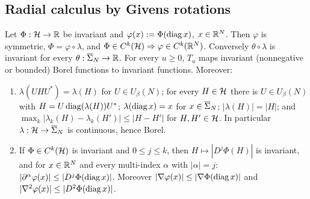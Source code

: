 \subsection{Radial calculus by Givens rotations}

\begin{lemma}\label{lem:inv}
Let $\Phi:\mathcal{H}\to\mathbb{R}$ be invariant and $\varphi(x):=\Phi(\operatorname{diag} x)$, $x\in\mathbb{R}^N$. Then $\varphi$ is symmetric, $\Phi=\varphi\circ\lambda$, and $\Phi\in C^k(\mathcal{H})\Rightarrow\varphi\in C^k(\mathbb{R}^N)$.
Conversely $\theta\circ\lambda$ is invariant for every $\theta:\overline{\Sigma}_N\to\mathbb{R}$. For every $u\ge0$, $T_u$ maps invariant (nonnegative or bounded) Borel functions to invariant functions.
Moreover:
\begin{enumerate}[label=\textup{(\alph*)},leftmargin=2em,itemsep=1pt]
\item $\lambda(UHU^*)=\lambda(H)$ for $U\in U_\beta(N)$; for every $H\in\mathcal{H}$ there is $U\in U_\beta(N)$ with $H=U\operatorname{diag}(\lambda(H))U^*$; $\lambda(\operatorname{diag} x)=x$ for $x\in\overline{\Sigma}_N$; $|\lambda(H)|=|H|$; and $\max_k|\lambda_k(H)-\lambda_k(H')|\le|H-H'|$ for $H,H'\in\mathcal{H}$. In particular $\lambda:\mathcal{H}\to\overline{\Sigma}_N$ is continuous, hence Borel.
\item If $\Phi\in C^k(\mathcal{H})$ is invariant and $0\le j\le k$, then $H\mapsto|D^j\Phi(H)|$ is invariant, and for $x\in\mathbb{R}^N$ and every multi-index $\alpha$ with $|\alpha|=j$: $|\partial^\alpha\varphi(x)|\le|D^j\Phi(\operatorname{diag} x)|$. Moreover $|\nabla\varphi(x)|\le|\nabla\Phi(\operatorname{diag} x)|$ and $|\nabla^2\varphi(x)|\le|D^2\Phi(\operatorname{diag} x)|$.
\end{enumerate}
\end{lemma}

